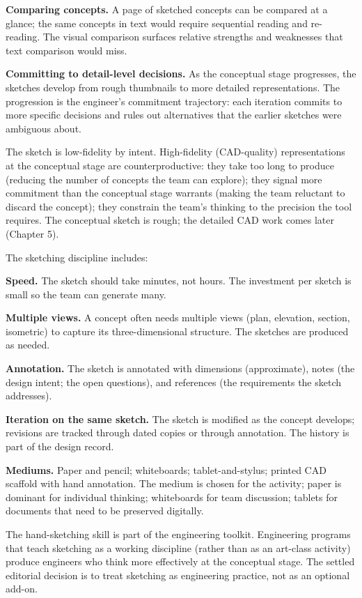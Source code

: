 \textbf{Comparing concepts.} A page of sketched concepts can be compared at a glance; the same concepts in text would require sequential reading and re-reading. The visual comparison surfaces relative strengths and weaknesses that text comparison would miss.

\textbf{Committing to detail-level decisions.} As the conceptual stage progresses, the sketches develop from rough thumbnails to more detailed representations. The progression is the engineer's commitment trajectory: each iteration commits to more specific decisions and rules out alternatives that the earlier sketches were ambiguous about.

The sketch is low-fidelity by intent. High-fidelity (CAD-quality) representations at the conceptual stage are counterproductive: they take too long to produce (reducing the number of concepts the team can explore); they signal more commitment than the conceptual stage warrants (making the team reluctant to discard the concept); they constrain the team's thinking to the precision the tool requires. The conceptual sketch is rough; the detailed CAD work comes later (Chapter 5).

The sketching discipline includes:

\textbf{Speed.} The sketch should take minutes, not hours. The investment per sketch is small so the team can generate many.

\textbf{Multiple views.} A concept often needs multiple views (plan, elevation, section, isometric) to capture its three-dimensional structure. The sketches are produced as needed.

\textbf{Annotation.} The sketch is annotated with dimensions (approximate), notes (the design intent; the open questions), and references (the requirements the sketch addresses).

\textbf{Iteration on the same sketch.} The sketch is modified as the concept develops; revisions are tracked through dated copies or through annotation. The history is part of the design record.

\textbf{Mediums.} Paper and pencil; whiteboards; tablet-and-stylus; printed CAD scaffold with hand annotation. The medium is chosen for the activity; paper is dominant for individual thinking; whiteboards for team discussion; tablets for documents that need to be preserved digitally.

The hand-sketching skill is part of the engineering toolkit. Engineering programs that teach sketching as a working discipline (rather than as an art-class activity) produce engineers who think more effectively at the conceptual stage. The settled editorial decision is to treat sketching as engineering practice, not as an optional add-on.

